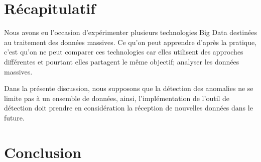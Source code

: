 
\section{Récapitulatif}

Nous avons eu l'occasion d'expérimenter plusieurs technologies Big Data destinées au traitement des données massives. Ce qu'on peut apprendre d'après la pratique, c'est qu'on ne peut comparer ces technologies car elles utilisent des approches différentes et pourtant elles partagent le même objectif; analyser les données massives.

Dans la présente  discussion, nous supposons que la détection des anomalies ne se limite pas à un ensemble de données, ainsi, l'implémentation de l'outil de détection doit prendre en considération la réception de nouvelles données dans le future.







\section{Conclusion}